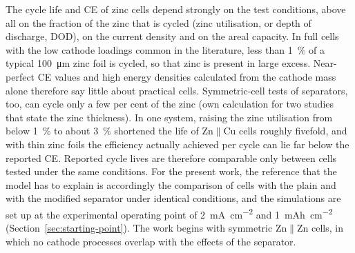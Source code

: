 The cycle life and CE of zinc cells depend strongly on the test conditions, above all on the fraction of the zinc that is cycled (zinc utilisation, or depth of discharge, DOD), on the current density and on the areal capacity.
In full cells with the low cathode loadings common in the literature, less than \SI{1}{\percent} of a typical \SI{100}{\um} zinc foil is cycled, so that zinc is present in large excess.
Near-perfect CE values and high energy densities calculated from the cathode mass alone therefore say little about practical cells\cite{li_toward_2022}.
Symmetric-cell tests of separators, too, can cycle only a few per cent of the zinc (own calculation for two studies that state the zinc thickness)\cite{sun_janus_2023,kim_mechanically_2025}.
In one system, raising the zinc utilisation from below \SI{1}{\percent} to about \SI{3}{\percent} shortened the life of Zn$\|$Cu cells roughly fivefold\cite{dong_towards_2022}, and with thin zinc foils the efficiency actually achieved per cycle can lie far below the reported CE\cite{wu_zinc-anode_2024}.
Reported cycle lives are therefore comparable only between cells tested under the same conditions.
For the present work, the reference that the model has to explain is accordingly the comparison of cells with the plain and with the modified separator under identical conditions, and the simulations are set up at the experimental operating point of \SI{2}{mA.cm^{-2}} and \SI{1}{mAh.cm^{-2}} (Section~\ref{sec:starting-point}).
The work begins with symmetric Zn$\|$Zn cells, in which no cathode processes overlap with the effects of the separator.

